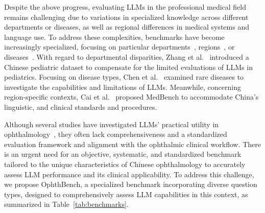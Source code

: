 Despite the above progress, evaluating LLMs in the professional medical field remains challenging due to variations in specialized knowledge across different departments or diseases, as well as regional differences in medical systems and language use.
To address these complexities, benchmarks have become increasingly specialized, focusing on particular departments~\cite{zhang2024pediabench,DBLP:journals/corr/abs-2406-01126}, regions~\cite{DBLP:conf/aaai/0001WWMZWH24,jiang2024jmedbench}, or diseases~\cite{DBLP:conf/kdd/ChenMGWZC24}.
With regard to departmental disparities, Zhang et al.~\cite{zhang2024pediabench} introduced a Chinese pediatric dataset to compensate for the limited evaluations of LLMs in pediatrics.
Focusing on disease types, Chen et al.~\cite{DBLP:conf/kdd/ChenMGWZC24} examined rare diseases to investigate the capabilities and limitations of LLMs.
Meanwhile, concerning region-specific contexts,  Cai et al.~\cite{DBLP:conf/aaai/0001WWMZWH24} proposed MedBench to accommodate China's linguistic, and clinical standards and procedures. 

Although several studies have investigated LLMs' practical utility in ophthalmology~\cite{lim2023benchmarking,antaki2023capabilities,bernstein2023comparison,huang2024assessment}, they often lack comprehensiveness and a standardized evaluation framework and alignment with the ophthalmic clinical workflow.
There is an urgent need for an objective, systematic, and standardized benchmark tailored to the unique characteristics of Chinese ophthalmology to accurately assess LLM performance and its clinical applicability. 
To address this challenge, we propose OphthBench, a specialized benchmark incorporating diverse question types, designed to comprehensively assess LLM capabilities in this context, as summarized in Table~\ref{tab:benchmarks}.

